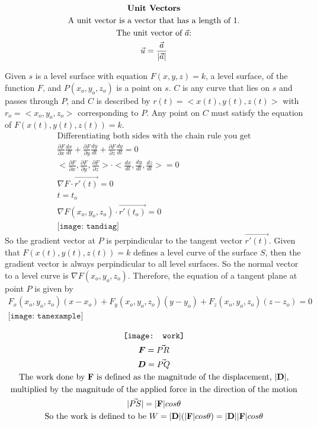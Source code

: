 \documentclass{article}
\begin{document}
\begin{gather*}
\text{\textbf{Unit Vectors}}
\\
   \text{A unit vector is a vector that has a length of 1.}
   \\
   \text{The unit vector of } \Vec{a} \text{:}
   \\
   \Vec{u}= \frac{\Vec{a}}{|\Vec{a}|}
\end{gather*}

Given $s$ is a level surface with equation $F(x,y,z) = k$, a level surface, of the function $F$, and $P(x_o,y_o,z_o)$ is a point on $s$. $C$ is any curve that lies on $s$ and passes through $P$, and $C$ is described by $r(t) = <x(t), y(t), z(t)>$ with $r_o = <x_o, y_o, z_o>$ corresponding to $P$. Any point on $C$ must satisfy the equation of $F(x(t), y(t), z(t)) = k$.
\begin{gather*}
   \text{Differentiating both sides with the chain rule you get}
   \\
   \frac{\partial{F}}{\partial{x}}\frac{dx}{dt} + \frac{\partial{F}}{\partial{y}}\frac{dy}{dt} + \frac{\partial{F}}{\partial{z}}\frac{dy}{dt} = 0
   \\
   <\frac{\partial{F}}{\partial{x}}, \frac{\partial{F}}{\partial{y}}, \frac{\partial{F}}{\partial{z}}>\cdot<\frac{dx}{dt}, \frac{dy}{dt}, \frac{dz}{dt}> = 0
   \\
   \nabla F\cdot\vec{r'(t)} = 0
   \\
   t = t_o
   \\
   \nabla F(x_o, y_o, z_o)\cdot\vec{r'(t_o)} = 0
   \\
   \texttt{[image: tandiag]}
\end{gather*}
   So the gradient vector at $P$ is perpindicular to the tangent vector $\vec{r'(t)}$. Given that $F(x(t), y(t), z(t)) = k$ defines a level curve of the surface $S$, then the gradient vector is always perpindicular to all level surfaces. So the normal vector to a level curve is $\nabla F(x_o, y_o, z_o)$. Therefore, the equation of a tangent plane at point $P$ is given by
\begin{gather*}
   F_x(x_o, y_o, z_o)(x-x_o) + F_y(x_o, y_o, z_o)(y-y_o) + F_z(x_o, y_o, z_o)(z-z_o) = 0 
   \\
   \texttt{[image: tanexample]}
\end{gather*}

\begin{gather*}
   \texttt{[image: work]}
   \\
   \boldsymbol{F} = \vec{PR}
   \\
   \boldsymbol{D} = \vec{PQ}
   \\
   \text{The work done by $\bf{F}$ is defined as the magnitude of the displacement, $|\bf{D}|$,}
   \\
   \text{multiplied by the magnitude of the applied force in the direction of the motion}
   \\
   |\vec{PS}| = |\textbf{F} |cos\theta
   \\
   \text{So the work is defined to be }
   W = |\textbf{D}|(|\textbf{F} |cos\theta) = |\textbf{D}||\textbf{F}| cos\theta
\end{gather*}
\end{document}
